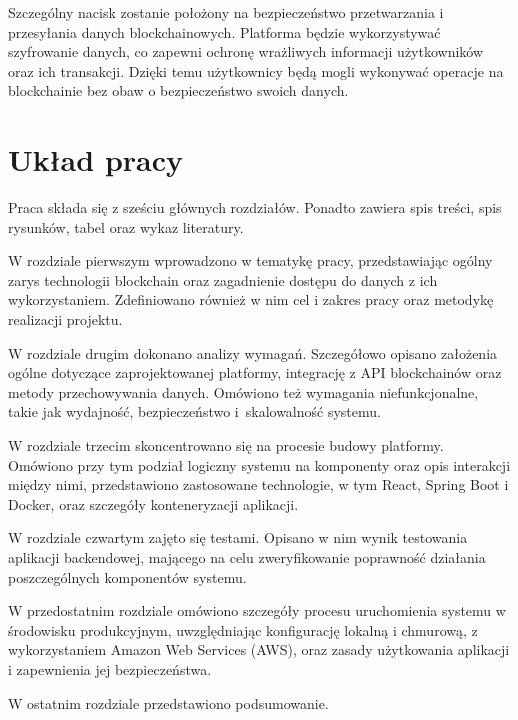 Szczególny nacisk zostanie położony na bezpieczeństwo przetwarzania i przesyłania danych blockchainowych. Platforma będzie wykorzystywać szyfrowanie danych, co zapewni ochronę wrażliwych informacji użytkowników oraz ich transakcji. Dzięki temu użytkownicy będą mogli wykonywać operacje na blockchainie bez obaw o bezpieczeństwo swoich danych.

\section{Układ pracy}
Praca składa się z sześciu głównych rozdziałów. Ponadto zawiera spis treści, spis rysunków, tabel oraz wykaz literatury.

W rozdziale pierwszym wprowadzono w tematykę pracy, przedstawiając ogólny zarys technologii blockchain oraz zagadnienie dostępu do danych z ich wykorzystaniem. Zdefiniowano również w nim cel i zakres pracy oraz metodykę realizacji projektu. 

W rozdziale drugim dokonano analizy wymagań. Szczegółowo opisano założenia ogólne dotyczące zaprojektowanej platformy, integrację z API blockchainów oraz metody przechowywania danych. Omówiono też wymagania niefunkcjonalne, takie jak wydajność, bezpieczeństwo i~skalowalność systemu. 

W rozdziale trzecim skoncentrowano się na procesie budowy platformy. Omówiono przy tym podział logiczny systemu na komponenty oraz opis interakcji między nimi, przedstawiono zastosowane technologie, w tym React, Spring Boot i Docker, oraz szczegóły konteneryzacji aplikacji. 

W rozdziale czwartym zajęto się testami. Opisano w nim wynik testowania aplikacji backendowej, mającego na celu zweryfikowanie poprawność działania poszczególnych komponentów systemu. 

W przedostatnim rozdziale omówiono szczegóły procesu uruchomienia systemu w środowisku produkcyjnym, uwzględniając konfigurację lokalną i chmurową, z wykorzystaniem Amazon Web Services (AWS), oraz zasady użytkowania aplikacji i zapewnienia jej bezpieczeństwa. 

W ostatnim rozdziale przedstawiono podsumowanie. 

